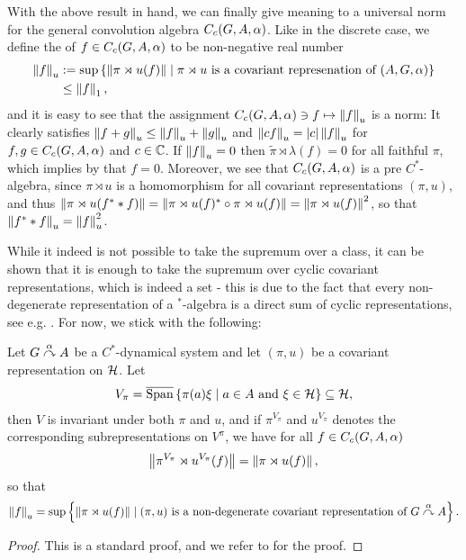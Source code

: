With the above result in hand, we can finally give meaning to a universal norm for the general convolution algebra $C_c(G,A,\alpha)$. Like in the discrete case, we define the  of $f \in C_c(G,A,\alpha)$ to be non-negative real number
\begin{align*}
	\left\lVert f \right\rVert_u &:= \sup\left\{ \left\lVert \pi \rtimes u (f)\right\rVert \mid  \pi \rtimes u \text{ is a covariant represenation of }(A,G ,\alpha) \right\}\\
	&\leq \left\lVert f \right\rVert_1,
\end{align*}
and it is easy to see that the assignment $C_c(G,A,\alpha) \ni f \mapsto \left\lVert f \right\rVert_u$ is a norm: It clearly satisfies $\left\lVert f + g \right\rVert_u \leq \left\lVert f \right\rVert_u + \left\lVert g \right\rVert_u$ and $\left\lVert cf \right\rVert_u = |c| \left\lVert f \right\rVert_u$ for $f,g \in C_c(G,A,\alpha)$ and $c \in \mathbb{C}$. If $\left\lVert f \right\rVert_u = 0$ then $\tilde{\pi} \rtimes \lambda (f) = 0$ for all faithful $\pi$, which implies by  that $f = 0$. Moreover, we see that $C_c(G,A,\alpha)$ is a pre $C^*$-algebra, since $\pi \rtimes u$ is a homomorphism for all covariant representations $(\pi,u)$, and thus $\left\lVert \pi \rtimes u (f^*\ast f)\right\rVert = \left\lVert \pi \rtimes u(f)^* \circ \pi \rtimes u(f)\right\rVert = \left\lVert \pi \rtimes u (f)\right\rVert^2$, so that $\left\lVert f^* \ast f\right\rVert_u = \left\lVert f \right\rVert_u^2$. 
\begin{note}
	While it indeed is not possible to take the supremum over a class, it can be shown that it is enough to take the supremum over cyclic covariant representations, which is indeed a set - this is due to the fact that every non-degenerate representation of a $^*$-algebra is a direct sum of cyclic representations, see e.g. \cite[Theorem 5.1.3]{murphy2014c}. For now, we stick with the following:
\end{note}
\begin{lemma}
	Let $G \stackrel{\alpha}{\curvearrowright} A$ be a $C^*$-dynamical system and let $(\pi,u)$ be a covariant representation on $\mathcal{H}$. Let 
	\begin{align*}
		V_\pi = \overline {\mathrm{Span}}\left\{ \pi(a) \xi \mid a \in A \text{ and } \xi \in \mathcal{H} \right\} \subseteq \mathcal{H},
	\end{align*}
	then $V$ is invariant under both $\pi$ and $u$, and if $\pi^{V_\pi}$ and $ u^{V_\pi}$ denotes the corresponding subrepresentations on $V^{\pi}$, we have for all $f \in C_c(G,A,\alpha)$ 
	\begin{align*}
		\left\lVert \pi ^{V_\pi} \rtimes u^{V_\pi}(f) \right\rVert = \left\lVert \pi \rtimes u (f) \right\rVert,
	\end{align*}
	so that
	\begin{align*}
		\left\lVert f \right\rVert_u = \sup\left\{ \left\lVert \pi \rtimes u(f) \right\rVert \mid  (\pi,u) \text{ is a non-degenerate covariant representation of } G \stackrel{\alpha}{\curvearrowright} A\right\}.
	\end{align*}
	\label{cross:essnorm}
\end{lemma}
\begin{proof}
	This is a standard proof, and we refer to \cite[52]{williamscrossed} for the proof.
\end{proof}

